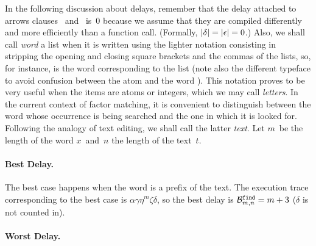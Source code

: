 In the following discussion about delays, remember that the delay
attached to arrows clauses \clause{\delta}~and~\clause{\epsilon}
is~\(0\) because we assume that they are compiled differently and more
efficiently than a function call. (Formally, \(\len{\delta} =
\len{\epsilon} = 0\).)  Also, we shall call \emph{word} a list when it
is written using the lighter notation consisting in stripping the
opening and closing square brackets and the commas of the \Erlang
lists, so, for instance,  is the word corresponding to the
list \erlcode{[a,b,c]} (note also the different typeface to avoid
confusion between the atom  and the word
). This notation proves to be very useful when the items are
atoms or integers, which we may call \emph{letters}. In the current
context of factor matching, it is convenient to distinguish between
the word whose occurrence is being searched and the one in which it is
looked for. Following the analogy of text editing, we shall call the
latter \emph{text}. Let \(m\)~be the length of the word
\(x\)~and~\(n\) the length of the text~\(t\).

\medskip

\paragraph{Best Delay.}

The best case happens when the word is a prefix of the text. The
execution trace corresponding to the best case is
\(\alpha\gamma\eta^m\zeta\delta\), so the best delay is
\(\best{find}{m,n} = m+3\) (\(\delta\) is not counted
in).\label{naive_best}

\medskip

\paragraph{Worst Delay.}

